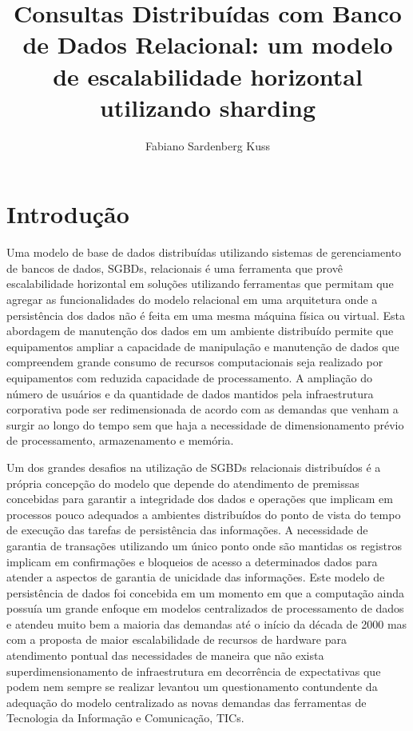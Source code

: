 \documentclass[12pt, a4paper]{article}
\begin{document}
\onehalfspace

\title{Consultas Distribuídas com Banco de Dados Relacional: um modelo de escalabilidade horizontal utilizando sharding}
\author{Fabiano Sardenberg Kuss}





\section{Introdução}

Uma modelo de base de dados distribuídas utilizando sistemas de gerenciamento de bancos de dados, SGBDs, relacionais é uma
ferramenta que provê escalabilidade horizontal em soluções utilizando ferramentas que permitam que agregar 
as funcionalidades do modelo relacional em uma arquitetura onde a persistência dos dados não é feita em
uma mesma máquina física ou virtual. Esta abordagem de manutenção dos dados em um ambiente distribuído 
permite que equipamentos ampliar a capacidade de manipulação e manutenção de dados que compreendem grande
consumo de recursos computacionais seja realizado por equipamentos com reduzida capacidade de processamento.
A ampliação do número de usuários e da quantidade de dados mantidos pela infraestrutura corporativa pode
ser redimensionada de acordo com as demandas que venham a surgir ao longo do tempo sem que haja a necessidade
de dimensionamento prévio de processamento, armazenamento e memória.

Um dos grandes desafios na utilização de SGBDs relacionais distribuídos é a própria concepção
do modelo que depende do atendimento de premissas concebidas para garantir a integridade dos dados e operações
que implicam em processos pouco adequados a ambientes distribuídos do ponto de vista do tempo de execução
das tarefas de persistência das informações. A necessidade de garantia de transações utilizando um único 
ponto onde são mantidas os registros implicam em confirmações e bloqueios de acesso a determinados dados
para atender a aspectos de garantia de unicidade das informações. Este modelo de persistência de dados
foi concebida em um momento em que a computação ainda possuía um grande enfoque em modelos centralizados
de processamento de dados e atendeu muito bem a maioria das demandas até o início da década de 2000 \cite{kossmann2000state} mas
com a proposta de maior escalabilidade de recursos de hardware para atendimento pontual das necessidades
de maneira que não exista superdimensionamento de infraestrutura em decorrência de expectativas que podem
nem sempre se realizar levantou um questionamento contundente da adequação do modelo centralizado as novas
demandas das ferramentas de Tecnologia da Informação e Comunicação, TICs.
\end{document}
